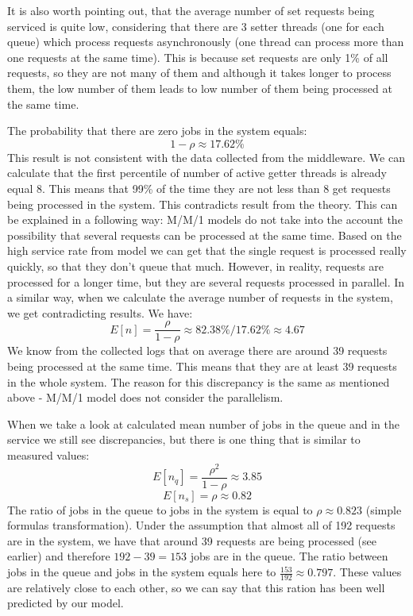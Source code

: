 \documentclass[11pt]{article}
\begin{document}
It is also worth pointing out, that the average number of set requests being serviced is quite low, considering that there are 3 setter threads (one for each queue) which process requests asynchronously (one thread can process more than one requests at the same time). This is because set requests are only 1\% of all requests, so they are not many of them and although it takes longer to process them, the low number of them leads to low number of them being processed at the same time.

The  probability that there are zero jobs in the system equals: $$1 - \rho \approx 17.62\%$$ 
This result is not consistent with the data collected from the middleware. We can calculate that the first percentile of number of active getter threads is already equal 8. This means that 99\% of the time they are not less than 8 get requests being processed in the system. This contradicts result from the theory. This can be explained in a following way: M/M/1 models do not take into the account the possibility that several requests can be processed at the same time. Based on the high service rate from model we can get that the single request is processed really quickly, so that they don't queue that much. However, in reality, requests are processed for a longer time, but they are several requests processed in parallel. In a similar way, when we calculate the average number of requests in the system, we get contradicting results. We have:
$$E[n] = \frac{\rho}{1 - \rho} \approx{82.38\%}/{17.62\%} \approx 4.67$$
We know from the collected logs that on average there are around 39 requests being processed at the same time. This means that they are at least 39 requests in the whole system. The reason for this discrepancy is the same as mentioned above - M/M/1 model does not consider the parallelism. 

When we take a look at calculated mean number of jobs in the queue and in the service we still see discrepancies, but there is one thing that is similar to measured values:
$$E[n_q] = \frac{\rho^2}{1-\rho} \approx 3.85$$
$$E[n_s] = \rho \approx 0.82$$
The ratio of jobs in the queue to jobs in the system is equal to $\rho \approx 0.823$ (simple formulas transformation). Under the assumption that almost all of 192 requests are in the system, we have that around 39 requests are being processed (see earlier) and therefore $192-39 = 153$ jobs are in the queue. The ratio between jobs in the queue and jobs in the system equals here to $\frac{153}{192} \approx 0.797$. These values are relatively close to each other, so we can say that this ration has been well predicted by our model.
\end{document}
